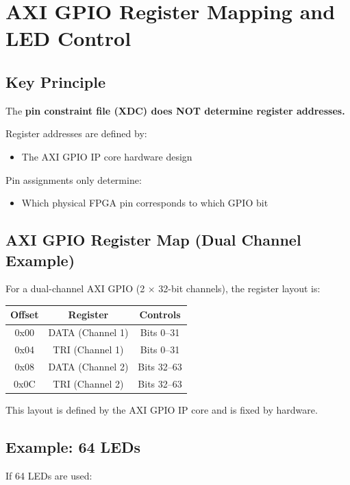 \section{AXI GPIO Register Mapping and LED Control}

\subsection{Key Principle}

The \textbf{pin constraint file (XDC) does NOT determine register addresses.}

Register addresses are defined by:
\begin{itemize}
    \item The AXI GPIO IP core hardware design
\end{itemize}

Pin assignments only determine:
\begin{itemize}
    \item Which physical FPGA pin corresponds to which GPIO bit
\end{itemize}

\subsection{AXI GPIO Register Map (Dual Channel Example)}

For a dual-channel AXI GPIO (2 × 32-bit channels), the register layout is:

\begin{center}
\begin{tabular}{|c|c|c|}
\hline
Offset & Register & Controls \\ \hline
0x00 & DATA (Channel 1) & Bits 0--31 \\ \hline
0x04 & TRI (Channel 1)  & Bits 0--31 \\ \hline
0x08 & DATA (Channel 2) & Bits 32--63 \\ \hline
0x0C & TRI (Channel 2)  & Bits 32--63 \\ \hline
\end{tabular}
\end{center}

This layout is defined by the AXI GPIO IP core and is fixed by hardware.

\subsection{Example: 64 LEDs}

If 64 LEDs are used:

